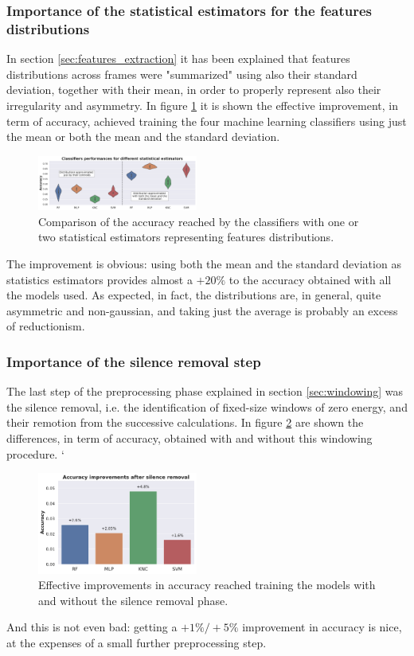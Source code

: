 \subsubsection{Importance of the statistical estimators for the features distributions}
\label{app:stat_estimators}
In section \ref{sec:features_extraction} it has been explained that features distributions across frames were "summarized" using also their standard deviation, together with their mean, in order to properly represent also their irregularity and asymmetry. In figure \ref{fig:stat_estimators} it is shown the effective improvement, in term of accuracy, achieved training the four machine learning classifiers using just the mean or both the mean and the standard deviation.
\begin{figure}[!h]
	\centering
	\includegraphics[width=0.47\textwidth]{pictures/stat_estimators.pdf}
	\caption{Comparison of the accuracy reached by the classifiers with one or two statistical estimators representing features distributions.}
	\label{fig:stat_estimators}
\end{figure}
The improvement is obvious: using both the mean and the standard deviation as statistics estimators provides almost a $+20\%$ to the accuracy obtained with all the models used. As expected, in fact, the distributions are, in general, quite asymmetric and non-gaussian, and taking just the average is probably an excess of reductionism.


\subsubsection{Importance of the silence removal step}
\label{app:importance_windowing}
The last step of the preprocessing phase explained in section \ref{sec:windowing} was the silence removal, i.e. the identification of fixed-size windows of zero energy, and their remotion from the successive calculations. In figure 	\ref{fig:silence_removal} are shown the differences, in term of accuracy, obtained with and without this windowing procedure.
`\begin{figure}[!t]
	\centering
	\includegraphics[width=0.47\textwidth]{pictures/silence_removal.pdf}
	\caption{Effective improvements in accuracy reached training the models with and without the silence removal phase.}
	\label{fig:silence_removal}
\end{figure}
And this is not even bad: getting a $+1\%/+5\%$ improvement in accuracy is nice, at the expenses of a small further preprocessing step.

